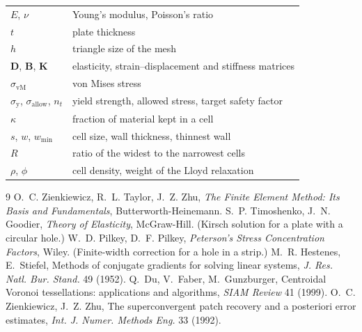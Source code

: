 \documentclass[11pt,a4paper]{article}
\newcommand{\mat}[1]{\mathbf{#1}}
\newcommand{\vm}{\sigma_{\mathrm{vM}}}
\newcommand{\allow}{\sigma_{\mathrm{allow}}}
\newcommand{\yield}{\sigma_{\mathrm{y}}}
\begin{document}
\begin{tabular}{ll}
  $E$, $\nu$ & Young's modulus, Poisson's ratio\\
  $t$ & plate thickness\\
  $h$ & triangle size of the mesh\\
  $\mat{D}$, $\mat{B}$, $\mat{K}$ & elasticity, strain--displacement and stiffness matrices\\
  $\vm$ & von Mises stress\\
  $\yield$, $\allow$, $n_t$ & yield strength, allowed stress, target safety factor\\
  $\kappa$ & fraction of material kept in a cell\\
  $s$, $w$, $w_{\min}$ & cell size, wall thickness, thinnest wall\\
  $R$ & ratio of the widest to the narrowest cells\\
  $\rho$, $\phi$ & cell density, weight of the Lloyd relaxation\\
\end{tabular}

\begin{thebibliography}{9}
  O.~C. Zienkiewicz, R.~L. Taylor, J.~Z. Zhu,
  \emph{The Finite Element Method: Its Basis and Fundamentals},
  Butterworth-Heinemann.
  S.~P. Timoshenko, J.~N. Goodier,
  \emph{Theory of Elasticity}, McGraw-Hill.
  (Kirsch solution for a plate with a circular hole.)
  W.~D. Pilkey, D.~F. Pilkey,
  \emph{Peterson's Stress Concentration Factors}, Wiley.
  (Finite-width correction for a hole in a strip.)
  M.~R. Hestenes, E.~Stiefel,
  Methods of conjugate gradients for solving linear systems,
  \emph{J. Res. Natl. Bur. Stand.} 49 (1952).
  Q.~Du, V.~Faber, M.~Gunzburger,
  Centroidal Voronoi tessellations: applications and algorithms,
  \emph{SIAM Review} 41 (1999).
  O.~C. Zienkiewicz, J.~Z. Zhu,
  The superconvergent patch recovery and a posteriori error estimates,
  \emph{Int. J. Numer. Methods Eng.} 33 (1992).
\end{thebibliography}
\end{document}
